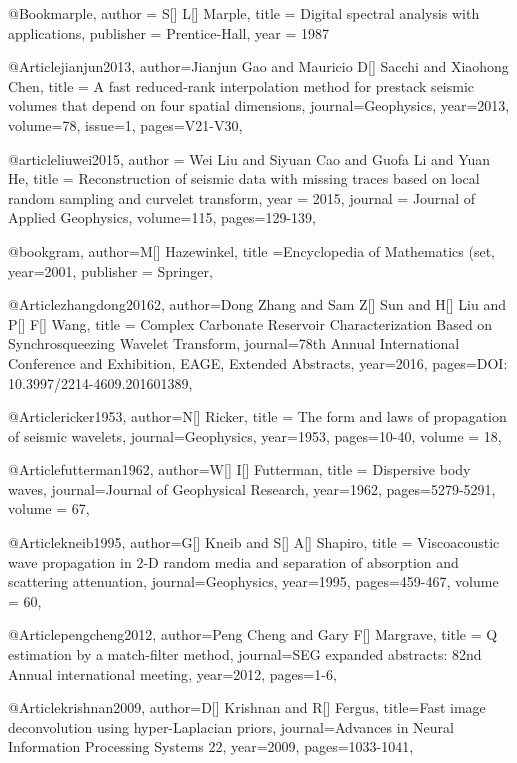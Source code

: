 @Book{marple,
  author = 	 {S[] L[] Marple},
  title = 	 {Digital spectral analysis with applications},
  publisher = 	 {Prentice-Hall},
  year = 	 1987}
  
@Article{jianjun2013,
  author={Jianjun Gao and Mauricio D[] Sacchi and Xiaohong Chen},
  title = {A fast reduced-rank interpolation method for prestack seismic volumes that depend on four spatial dimensions},
  journal={Geophysics},
  year=2013,
  volume=78,
    issue=1,
  pages={V21-V30},
}

@article{liuwei2015,
  author =	 {Wei Liu and Siyuan Cao and Guofa Li and Yuan He},
  title =	 {Reconstruction of seismic data with missing traces based on local random sampling and curvelet transform},
  year =	 2015,
  journal =	 {Journal of Applied Geophysics},
  volume={115},
 pages=129-139,
}

@book{gram,
  author={M[] Hazewinkel},
  title ={Encyclopedia of Mathematics (set},
  year=2001,
  publisher = {Springer},
}


@Article{zhangdong20162,
  author={Dong Zhang and Sam Z[] Sun and H[] Liu and P[] F[] Wang},
  title = {Complex Carbonate Reservoir Characterization Based on Synchrosqueezing Wavelet Transform},
  journal={78th Annual International Conference and Exhibition, EAGE, Extended Abstracts},
  year=2016,
  pages={DOI: 10.3997/2214-4609.201601389},
}






@Article{ricker1953,
  author={N[] Ricker},
  title = {The form and laws of propagation of seismic wavelets},
  journal={Geophysics},
  year=1953,
  pages={10-40},
  volume = 18,
}

@Article{futterman1962,
  author={W[] I[] Futterman},
  title = {Dispersive body waves},
  journal={Journal of Geophysical Research},
  year=1962,
  pages={5279-5291},
  volume = 67,
}

@Article{kneib1995,
  author={G[] Kneib and S[] A[] Shapiro},
  title = {Viscoacoustic wave propagation in 2-D random media and separation of absorption and scattering attenuation},
  journal={Geophysics},
  year=1995,
  pages={459-467},
  volume = 60,
}

@Article{pengcheng2012,
  author={Peng Cheng and Gary F[] Margrave},
  title = {Q estimation by a match-filter method},
  journal={SEG expanded abstracts: 82nd Annual international meeting},
  year=2012,
  pages={1-6},
}

@Article{krishnan2009,
  author={D[] Krishnan and R[] Fergus},
  title={Fast image deconvolution using hyper-Laplacian priors},
  journal={Advances in Neural Information Processing Systems 22},
  year=2009,
  pages={1033-1041},
}

